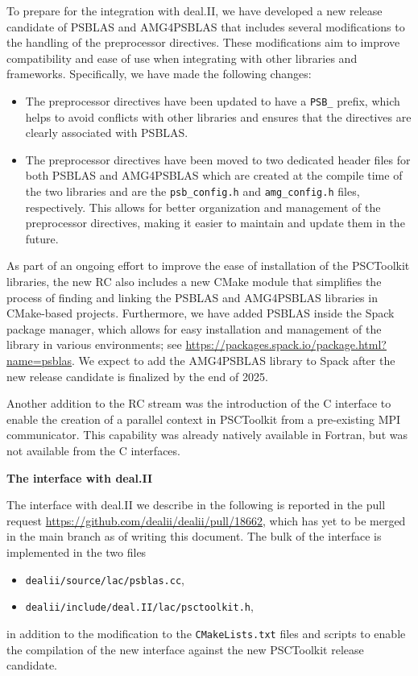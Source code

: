 \documentclass[a4paper,12pt, numbers]{article}
\begin{document}
To prepare for the integration with deal.II, we have developed a new release candidate of PSBLAS and AMG4PSBLAS
that includes several modifications to the handling of the preprocessor directives. These modifications aim
to improve compatibility and ease of use when integrating with other libraries and frameworks.
Specifically, we have made the following changes:
\begin{itemize}
\item The preprocessor directives have been updated to have a \verb|PSB_| prefix, which helps to
avoid conflicts with other libraries and ensures that the directives are clearly associated with PSBLAS.
\item The preprocessor directives have been moved to two dedicated header files for both PSBLAS and AMG4PSBLAS
which are created at the compile time of the two libraries and are the \verb|psb_config.h| and
\verb|amg_config.h| files, respectively. This allows for better organization and management of the
preprocessor directives, making it easier to maintain and update them in the future.
\end{itemize}

As part of an ongoing effort to improve the ease of installation of the PSCToolkit libraries, the new RC also
includes a new CMake module that simplifies the process of finding and linking the PSBLAS and AMG4PSBLAS libraries
in CMake-based projects. Furthermore, we have added PSBLAS inside the Spack package manager, which allows for
easy installation and management of the library in various environments; see \url{https://packages.spack.io/package.html?name=psblas}.
We expect to add the AMG4PSBLAS library to Spack after the new release candidate is finalized by the end of 2025.

Another addition to the RC stream was the introduction of the C interface to enable the creation of a parallel context
in PSCToolkit from a pre-existing MPI communicator. This capability was already natively available in Fortran,
but was not available from the C interfaces.


\noindent\textbf{The interface with deal.II}

The interface with deal.II we describe in the following is reported in the pull request
\url{https://github.com/dealii/dealii/pull/18662}, which has yet to be merged in the main branch as of writing this document.
The bulk of the interface is implemented in the two files
\begin{itemize}
\item \texttt{dealii/source/lac/psblas.cc},
\item \texttt{dealii/include/deal.II/lac/psctoolkit.h},
\end{itemize}
in addition to the modification to the \texttt{CMakeLists.txt} files and scripts to enable the
compilation of the new interface against the new PSCToolkit release candidate.
\end{document}
